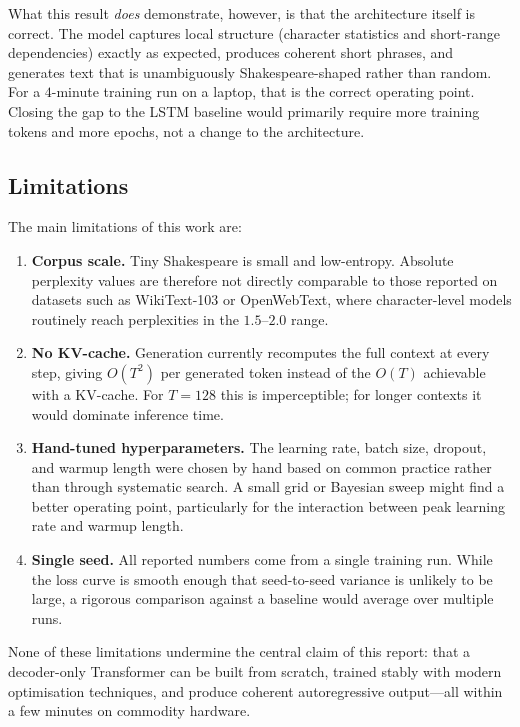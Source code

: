 \noindent What this result \emph{does} demonstrate, however, is that the
architecture itself is correct. The model captures local structure
(character statistics and short-range dependencies) exactly as expected,
produces coherent short phrases, and generates text that is
unambiguously Shakespeare-shaped rather than random. For a $4$-minute
training run on a laptop, that is the correct operating point. Closing
the gap to the LSTM baseline would primarily require more training
tokens and more epochs, not a change to the architecture.

\subsection{Limitations}
The main limitations of this work are:

\begin{enumerate}
    \item \textbf{Corpus scale.} Tiny Shakespeare is small and
          low-entropy. Absolute perplexity values are therefore not
          directly comparable to those reported on datasets such as
          WikiText-103 or OpenWebText, where character-level models
          routinely reach perplexities in the $1.5$--$2.0$ range.
    \item \textbf{No KV-cache.} Generation currently recomputes the full
          context at every step, giving $O(T^2)$ per generated token
          instead of the $O(T)$ achievable with a KV-cache. For
          $T = 128$ this is imperceptible; for longer contexts it would
          dominate inference time.
    \item \textbf{Hand-tuned hyperparameters.} The learning rate, batch
          size, dropout, and warmup length were chosen by hand based on
          common practice rather than through systematic search. A small
          grid or Bayesian sweep might find a better operating point,
          particularly for the interaction between peak learning rate
          and warmup length.
    \item \textbf{Single seed.} All reported numbers come from a single
          training run. While the loss curve is smooth enough that
          seed-to-seed variance is unlikely to be large, a rigorous
          comparison against a baseline would average over multiple runs.
\end{enumerate}

\noindent None of these limitations undermine the central claim of this report:
that a decoder-only Transformer can be built from scratch, trained
stably with modern optimisation techniques, and produce coherent
autoregressive output---all within a few minutes on commodity hardware.